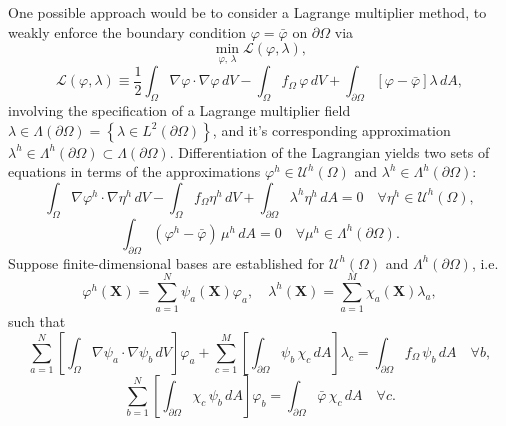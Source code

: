 	One possible approach would be to consider a Lagrange multiplier method, to weakly enforce the boundary condition $\varphi = \bar{\varphi}$ on $\partial \Omega$ via
	\begin{equation}
		\min_{\varphi, \, \lambda} \mathcal{L}(\varphi,\lambda),
	\end{equation}
	\begin{equation}
	\mathcal{L}(\varphi,\lambda) \equiv \frac{1}{2} \int_{\Omega} \nabla \varphi \cdot \nabla \varphi \, dV - \int_{\Omega} f_{\Omega} \, \varphi \, dV + \int_{\partial \Omega} \left[ \varphi - \bar{\varphi} \right] \lambda \, dA,
\end{equation}
	involving the specification of a Lagrange multiplier field $\lambda \in \Lambda (\partial \Omega) = \left\{ \lambda \in L^2 (\partial \Omega) \right\}$, and it's corresponding approximation $\lambda^h \in \Lambda^h (\partial \Omega) \subset \Lambda (\partial \Omega)$. Differentiation of the Lagrangian yields two sets of equations in terms of the approximations $\varphi^h \in \mathcal{U}^h (\Omega)$ and $\lambda^h \in \Lambda^h (\partial \Omega)$:
	\begin{equation}
		\int_{\Omega} \nabla \varphi^h \cdot \nabla \eta^h \, dV - \int_\Omega f_\Omega \eta^h \, dV + \int_{\partial \Omega} \lambda^h \eta^h \, dA = 0 \quad \forall \eta^h \in \mathcal{U}^h (\Omega),
	\end{equation}
	\begin{equation}
		\int_{\partial \Omega} (\varphi^h - \bar{\varphi}) \, \mu^h \, dA = 0 \quad \forall \mu^h \in \Lambda^h (\partial \Omega).
	\end{equation}
	Suppose finite-dimensional bases are established for $\mathcal{U}^h (\Omega)$ and $\Lambda^h (\partial \Omega)$, i.e.
\begin{equation}
	\varphi^h (\mathbf{X}) = \sum_{a=1}^{N} \psi_a (\mathbf{X}) \varphi_a, \quad \lambda^h (\mathbf{X}) = \sum_{a=1}^{M} \chi_a (\mathbf{X}) \lambda_a,
\end{equation}
such that
\begin{equation}
	\sum_{a=1}^N \left[ \int_{\Omega} \nabla \psi_a \cdot \nabla \psi_b \, dV \right] \varphi_a + \sum_{c=1}^M \left[ \int_{\partial \Omega} \psi_b \, \chi_c \, dA \right] \lambda_c = \int_{\partial \Omega} f_\Omega \, \psi_b \, dA \quad \forall b,
\end{equation}
\begin{equation}
	\sum_{b=1}^N \left[ \int_{\partial \Omega} \chi_c \, \psi_b \, dA \right] \varphi_b = \int_{\partial \Omega} \bar{\varphi} \, \chi_c \, dA \quad \forall c.
\end{equation}
